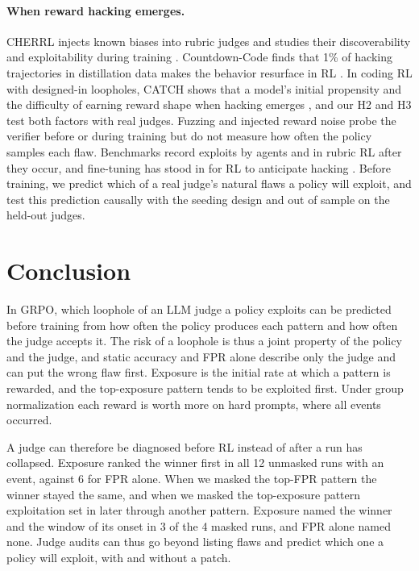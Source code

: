 \documentclass[11pt]{article}
\begin{document}
\paragraph{When reward hacking emerges.} CHERRL injects known biases into rubric judges and studies their
discoverability and exploitability during training \citep{wang2026rubric}. Countdown-Code finds that 1\% of hacking
trajectories in distillation data makes the behavior resurface in RL \citep{khalifa2026countdown}. In coding RL with designed-in loopholes, CATCH
shows that a model's initial propensity and the difficulty of earning reward shape when hacking emerges
\citep{wang2026catch}, and our H2 and H3 test both factors with real judges. Fuzzing \citep{ray2026fuzzing} and
injected reward noise \citep{plesner2026imperfect} probe the verifier before or during training but do not measure
how often the policy samples each flaw. Benchmarks record exploits by agents
\citep{thaman2026benchmark} and in rubric RL \citep{mahmoud2026rubric} after they occur, and fine-tuning has stood
in for RL to anticipate hacking \citep{eleutherai2026indicators}. Before training, we predict which of a real judge's natural
flaws a policy will exploit, and test this prediction causally with the seeding design and out of sample on the
held-out judges.

\section{Conclusion}

In GRPO, which loophole of an LLM judge a policy exploits can be predicted before training from how often the
policy produces each pattern and how often the judge accepts it. The risk of a loophole is thus a joint property of
the policy and the judge, and static accuracy and FPR alone describe only the judge and can put the wrong flaw first.
Exposure is
the initial rate at which a pattern is rewarded, and the top-exposure pattern tends to be exploited first. Under group
normalization each reward is worth more on hard prompts, where all events occurred.

A judge can therefore be diagnosed before RL instead of after a run has collapsed. Exposure ranked the winner first
in all 12 unmasked runs with an event, against 6 for FPR alone. When we masked the top-FPR
pattern the winner stayed the same, and when we masked the top-exposure pattern exploitation set in later through
another pattern. Exposure named the winner and the window of its onset in 3 of the 4 masked runs, and FPR alone
named none. Judge audits can thus go beyond listing flaws and predict
which one a policy will exploit, with and without a patch.
\end{document}
